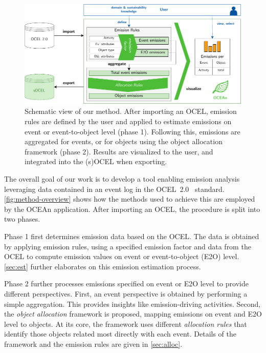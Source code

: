 
\begin{figure}[H]
  \begin{small}
    \begin{center}
      \includegraphics[width=.9\textwidth]{figures/concept/method-overview-4-method.pdf}
    \end{center}
    \caption{Schematic view of our method. After importing an OCEL, emission rules are defined by the user and applied to estimate emissions on event or event-to-object level (phase 1). Following this, emissions are aggregated for events, or for objects using the object allocation framework (phase 2). Results are visualized to the user, and integrated into the (s)OCEL when exporting.}
    \label{fig:method-overview}
  \end{small}
\end{figure}

The overall goal of our work is to develop a tool enabling emission analysis leveraging data contained in an event log in the OCEL~2.0~\cite{OCEL2} standard.
\autoref{fig:method-overview} shows how the methods used to achieve this are employed by the OCEAn application.
After importing an OCEL, the procedure is split into two phases.

Phase 1 first determines emission data based on the OCEL. The data is obtained by applying emission rules, using a specified emission factor and data from the OCEL to compute emission values on event or event-to-object (E2O) level.
\autoref{sec:est} further elaborates on this emission estimation process.

Phase 2 further processes emissions specified on event or E2O level to provide different perspectives.
First, an event perspective is obtained by performing a simple aggregation. This provides insights like emission-driving activities.
Second, the \textit{object allocation} framework is proposed, mapping emissions on event and E2O level to objects.
At its core, the framework uses different \textit{allocation rules} that identify those objects related most directly with each event.
Details of the framework and the emission rules are given in \autoref{sec:alloc}.

